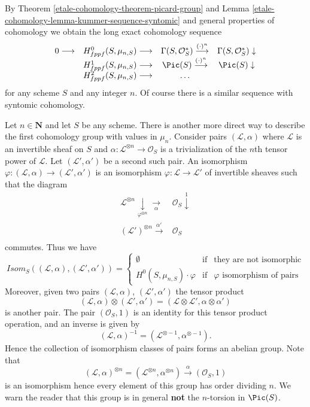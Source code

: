 By
Theorem \ref{etale-cohomology-theorem-picard-group}
and
Lemma \ref{etale-cohomology-lemma-kummer-sequence-syntomic}
and general properties of cohomology we obtain
the long exact cohomology sequence
$$
\begin{array}{cccc}0 \longrightarrow & H_{fppf}^0(S, \mu_{n, S}) \longrightarrow & \Gamma(S, \mathcal{O}_S^*) \overset{(\cdot)^n}{\longrightarrow} & \Gamma(S, \mathcal{O}_S^*) \downarrow \\  & H_{fppf}^1(S, \mu_{n, S}) \longrightarrow & \Pic(S) \overset{(\cdot)^n}{\longrightarrow} & \Pic(S) \downarrow \\  & H_{fppf}^2(S, \mu_{n, S}) \longrightarrow & \ldots & \end{array}
$$
for any scheme $S$ and any integer $n$. Of course there is a similar sequence
with syntomic cohomology.

\medskip\noindent
Let $n \in \mathbf{N}$ and let $S$ be any scheme.
There is another more direct way to describe the first cohomology group with
values in $\mu_n$. Consider pairs
$(\mathcal{L}, \alpha)$ where $\mathcal{L}$ is an invertible sheaf on $S$
and $\alpha : \mathcal{L}^{\otimes n} \to \mathcal{O}_S$ is a trivialization
of the $n$th tensor power of $\mathcal{L}$.
Let $(\mathcal{L}', \alpha')$ be a second such pair.
An isomorphism $\varphi : (\mathcal{L}, \alpha) \to (\mathcal{L}', \alpha')$
is an isomorphism $\varphi : \mathcal{L} \to \mathcal{L}'$ of invertible
sheaves such that the diagram
$$
\begin{array}{cc}\mathcal{L}^{\otimes n} \underset{\varphi^{\otimes n}}{\downarrow}\underset{\alpha}{\longrightarrow} & \mathcal{O}_S \overset{1}{\downarrow} \\ (\mathcal{L}')^{\otimes n} \overset{\alpha'}{\longrightarrow} & \mathcal{O}_S \\  & \end{array}
$$
commutes. Thus we have
\begin{equation}
\label{equation-isomorphisms-pairs}
\mathit{Isom}_S((\mathcal{L}, \alpha), (\mathcal{L}', \alpha'))
=
\left\{
\begin{matrix}
\emptyset & \text{if} & \text{they are not isomorphic} \\
H^0(S, \mu_{n, S})\cdot \varphi & \text{if} &
\varphi \text{ isomorphism of pairs}
\end{matrix}
\right.
\end{equation}
Moreover, given two pairs $(\mathcal{L}, \alpha)$, $(\mathcal{L}', \alpha')$
the tensor product
$$
(\mathcal{L}, \alpha) \otimes (\mathcal{L}', \alpha')
=
(\mathcal{L} \otimes \mathcal{L}', \alpha \otimes \alpha')
$$
is another pair. The pair $(\mathcal{O}_S, 1)$ is an identity for this
tensor product operation, and an inverse is given by
$$
(\mathcal{L}, \alpha)^{-1} = (\mathcal{L}^{\otimes -1}, \alpha^{\otimes -1}).
$$
Hence the collection of isomorphism classes of pairs forms an abelian group.
Note that
$$
(\mathcal{L}, \alpha)^{\otimes n}
=
(\mathcal{L}^{\otimes n}, \alpha^{\otimes n})
\xrightarrow{\alpha}
(\mathcal{O}_S, 1)
$$
is an isomorphism
hence every element of this group has order dividing $n$. We warn the reader
that this group is in general {\bf not} the $n$-torsion in $\Pic(S)$.

